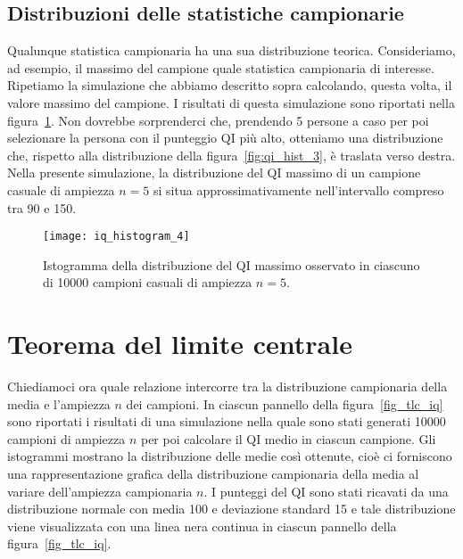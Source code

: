 \subsection{Distribuzioni delle statistiche campionarie}

Qualunque statistica campionaria ha una sua distribuzione teorica.
Consideriamo, ad esempio, il massimo del campione quale statistica campionaria di interesse.
Ripetiamo la simulazione che abbiamo descritto sopra calcolando, questa volta, il valore massimo del campione.
I risultati di questa simulazione sono riportati nella figura~\ref{fig:qi_hist_4}.
Non dovrebbe sorprenderci che, prendendo 5 persone a caso per poi selezionare la persona con il punteggio QI più alto, otteniamo una distribuzione che, rispetto alla distribuzione della figura~\ref{fig:qi_hist_3}, è traslata verso destra. 
Nella presente simulazione, la distribuzione del QI massimo di un campione casuale di ampiezza $n = 5$ si situa approssimativamente nell'intervallo compreso tra 90 e 150.

\begin{figure}[h!]
\centering
\texttt{[image: iq\_histogram\_4]}
\caption{Istogramma della distribuzione del QI massimo osservato in ciascuno di \num{10000} campioni casuali di ampiezza $n=5$.}
\label{fig:qi_hist_4}
\end{figure}



\section{Teorema del limite centrale}
\label{sec:tlc}

Chiediamoci ora quale relazione intercorre tra la distribuzione campionaria della media e l'ampiezza $n$ dei campioni.
In ciascun pannello della figura~\ref{fig_tlc_iq} sono riportati i risultati di una simulazione nella quale sono stati generati \num{10000} campioni di ampiezza $n$ per poi calcolare il QI medio in ciascun campione. 
Gli istogrammi mostrano la distribuzione delle medie così ottenute, cioè ci forniscono una rappresentazione grafica della distribuzione campionaria della media al variare dell'ampiezza campionaria $n$. 
I punteggi del QI sono stati ricavati da una distribuzione normale con media 100 e deviazione standard 15 e tale distribuzione viene visualizzata con una linea nera continua in ciascun pannello della figura~\ref{fig_tlc_iq}.

